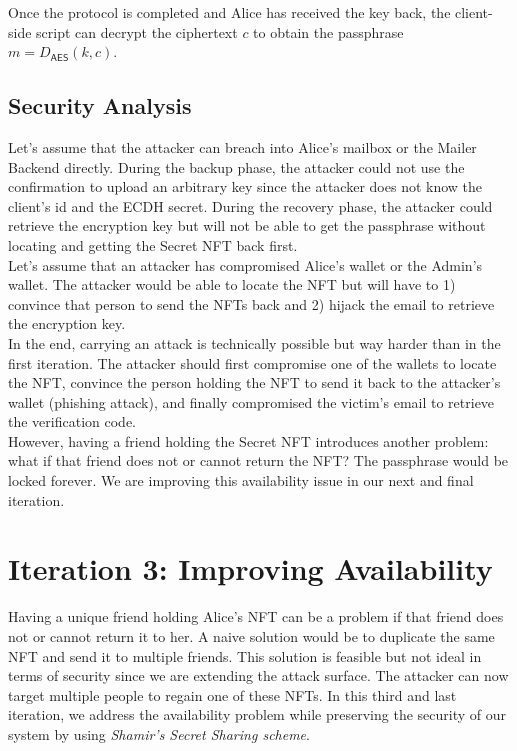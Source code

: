 \documentclass[runningheads]{llncs}
\newcommand{\ms}[1]{\ensuremath{\mathsf{#1}}}
\begin{document}
Once the protocol is completed and Alice has received the key back, the client-side script can decrypt the ciphertext $c$ to obtain the passphrase $m=D_{\ms{AES}}(k, c)$. 

\subsection{Security Analysis}

Let's assume that the attacker can breach into Alice's mailbox or the Mailer Backend directly. During the backup phase, the attacker could not use the confirmation to upload an arbitrary key since the attacker does not know the client's id and the ECDH secret. During the recovery phase, the attacker could retrieve the encryption key but will not be able to get the passphrase without locating and getting the Secret NFT back first. \\

Let's assume that an attacker has compromised Alice's wallet or the Admin's wallet. The attacker would be able to locate the NFT but will have to 1) convince that person to send the NFTs back and 2) hijack the email to retrieve the encryption key. \\

In the end, carrying an attack is technically possible but way harder than in the first iteration. The attacker should first compromise one of the wallets to locate the NFT, convince the person holding the NFT to send it back to the attacker's wallet (phishing attack), and finally compromised the victim's email to retrieve the verification code.\\

However, having a friend holding the Secret NFT introduces another problem: what if that friend does not or cannot return the NFT? The passphrase would be locked forever. We are improving this availability issue in our next and final iteration. 

\section{Iteration 3: Improving Availability}
\label{iteration3}

Having a unique friend holding Alice's NFT can be a problem if that friend does not or cannot return it to her. A naive solution would be to duplicate the same NFT and send it to multiple friends. This solution is feasible but not ideal in terms of security since we are extending the attack surface. The attacker can now target multiple people to regain one of these NFTs. In this third and last iteration, we address the availability problem while preserving the security of our system by using {\em Shamir's Secret Sharing scheme}. 
\end{document}
